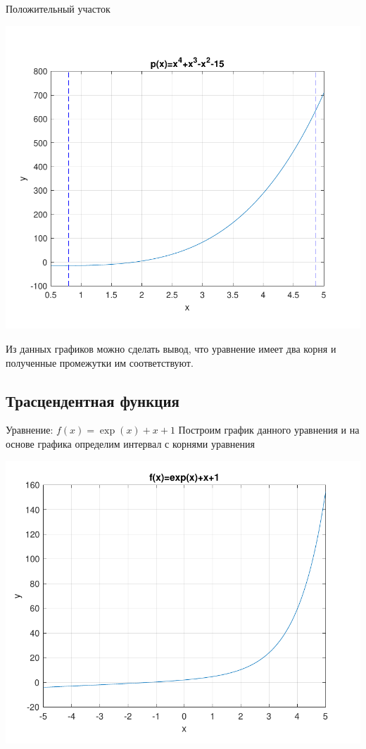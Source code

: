 Положительный участок

\includegraphics[scale=0.75]{3.pdf}

Из данных графиков можно сделать вывод, что уравнение имеет два корня и полученные промежутки им соответствуют.
\subsection{Трасцендентная функция}
Уравнение: \begin{math} 
	f(x)= \exp(x)+x+1
	\end{math}
Построим график данного уравнения и на основе графика определим интервал с корнями уравнения

\includegraphics[scale=0.75]{4.pdf}

